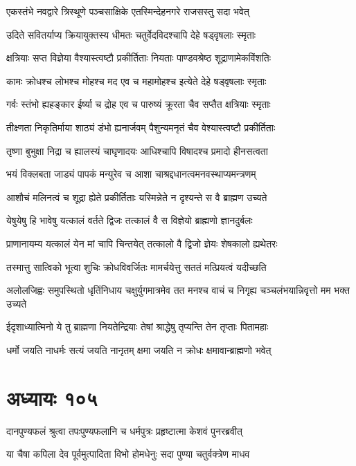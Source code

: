 \twolineshloka
{एकस्तंभे नवद्वारे त्रिस्थूणे पञ्चसाक्षिके}
{एतस्मिन्देहनगरे राजसस्तु सदा भवेत्}


\twolineshloka
{उदिते सवितर्याप्य क्रियायुक्तस्य धीमतः}
{चतुर्वेदविदश्चापि देहे षड्वृषलाः स्मृताः}


\twolineshloka
{क्षत्रियाः सप्त विज्ञेया वैश्यास्त्वष्टौ प्रकीर्तिताः}
{नियताः पाण्डवश्रेष्ठ शूद्राणामेकविंशतिः}


\twolineshloka
{कामः क्रोधश्च लोभश्च मोहश्च मद एव च}
{महामोहश्च इत्येते देहे षड्वृषलाः स्मृताः}


\twolineshloka
{गर्वः स्तंभो ह्यहङ्कार ईर्ष्या च द्रोह एव च}
{पारुष्यं क्रूरता चैव सप्तैत क्षत्रियाः स्मृताः}


\twolineshloka
{तीक्ष्णता निकृतिर्माया शाठ्यं डंभो ह्यनार्जवम्}
{पैशुन्यमनृतं चैव वेश्यास्त्वष्टौ प्रकीर्तिताः}


\twolineshloka
{तृष्णा बुभुक्षा निद्रा च ह्यालस्यं चाघृणादयः}
{आधिश्चापि विषादश्च प्रमादो हीनसत्वता}


\twolineshloka
{भयं विक्लबता जाड्यं पापकं मन्युरेव च}
{आशा चाश्रद्दधानत्वमनवस्थाप्यमन्त्रणम्}


\twolineshloka
{आशौचं मलिनत्वं च शूद्रा ह्येते प्रकीर्तिताः}
{यस्मिन्नेते न दृश्यन्ते स वै ब्राह्मण उच्यते}


\twolineshloka
{येषुयेषु हि भावेषु यत्कालं वर्तते द्विजः}
{तत्कालं वै स विज्ञेयो ब्राह्मणो ज्ञानदुर्बलः}


\twolineshloka
{प्राणानायम्य यत्कालं येन मां चापि चिन्तयेत्}
{तत्कालो वै द्विजो ज्ञेयः शेषकालो ह्यथेतरः}


\twolineshloka
{तस्मात्तु सात्विको भूत्वा शुचिः क्रोधविवर्जितः}
{मामर्चयेत्तु सततं मत्प्रियत्वं यदीच्छति}


\twolineshloka
{अलोलजिह्वः समुपस्थितो धृतिंनिधाय चक्षुर्युगमात्रमेव तत}
{मनश्च वाचं च निगृह्य चञ्चलंभयान्निवृत्तो मम भक्त उच्यते}


\twolineshloka
{ईदृशाध्यात्मिनो ये तु ब्राह्मणा नियतेन्द्रियाः}
{तेषां श्राद्धेषु तृप्यन्ति तेन तृप्ताः पितामहाः}


\twolineshloka
{धर्मो जयति नाधर्मः सत्यं जयति नानृतम्}
{क्षमा जयति न क्रोधः क्षमावान्ब्राह्मणो भवेत्}


\chapter{अध्यायः १०५}
\twolineshloka
{दानपुण्यफलं श्रुत्वा तपःपुण्यफलानि च}
{धर्मपुत्रः प्रहृष्टात्मा केशवं पुनरब्रवीत्}


\twolineshloka
{या चैषा कपिला देव पूर्वमुत्पादिता विभो}
{होमधेनुः सदा पुण्या चतुर्वक्त्रेण माधव}


